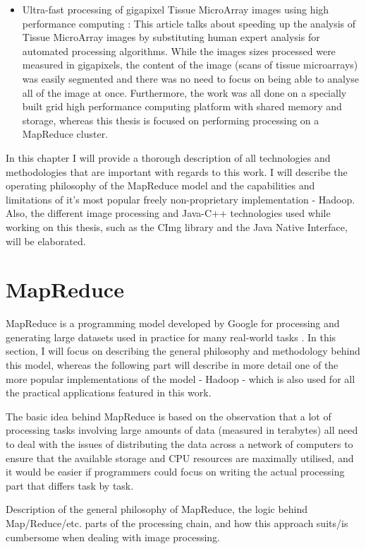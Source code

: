 \documentclass [12pt,a4paper]{report}
\begin{document}
\begin{itemize}
	\item Ultra-fast processing of gigapixel Tissue MicroArray images using high performance computing \cite{wang2011ult}: This article talks about speeding up the analysis of Tissue MicroArray images by substituting human expert analysis for automated processing algorithms. While the images sizes processed were measured in gigapixels, the content of the image (scans of tissue microarrays) was easily segmented and there was no need to focus on being able to analyse all of the image at once. Furthermore, the work was all done on a specially built grid high performance computing platform with shared memory and storage, whereas this thesis is focused on performing processing on a MapReduce cluster.
\end{itemize}

In this chapter I will provide a thorough description of all technologies and methodologies that are important with regards to this work. I will describe the operating philosophy of the MapReduce model and the capabilities and limitations of it's most popular freely non-proprietary implementation - Hadoop. Also, the different image processing and Java-C++ technologies used while working on this thesis, such as the CImg library and the Java Native Interface, will be elaborated.

\section{MapReduce}

MapReduce is a programming model developed by Google for processing and generating large datasets used in practice for many real-world tasks \cite{Dean:2008:MSD:1327452.1327492}. In this section, I will focus on describing the general philosophy and methodology behind this model, whereas the following part will describe in more detail one of the more popular implementations of the model - Hadoop - which is also used for all the practical applications featured in this work.

The basic idea behind MapReduce is based on the observation that a lot of processing tasks involving large amounts of data (measured in terabytes) all need to deal with the issues of distributing the data across a network of computers to ensure that the available storage and CPU resources are maximally utilised, and it would be easier if programmers could focus on writing the actual processing part that differs task by task.

Description of the general philosophy of MapReduce, the logic behind Map/Reduce/etc. parts of the processing chain, and how this approach suits/is cumbersome when dealing with image processing.
\end{document}
